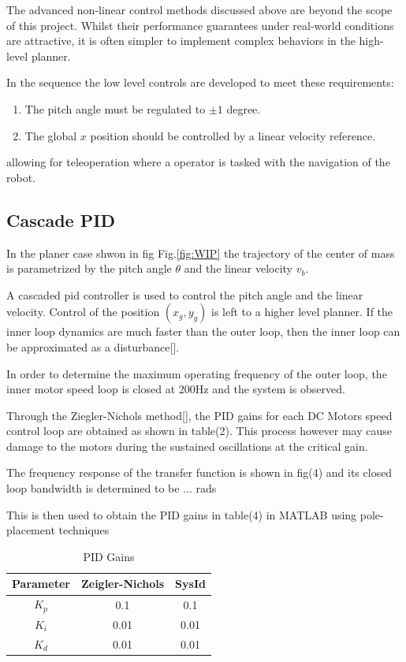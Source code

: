         The advanced non-linear control methods discussed above are beyond the scope of this project. 
        Whilst their performance guarantees under real-world conditions are attractive, it is often simpler 
        to implement complex behaviors in the high-level planner.

        In the sequence the low level controls are developed to meet these requirements:
        \begin{enumerate}
            \item The pitch angle must be regulated to $±1$ degree.
            \item The global $x$ position should be controlled by a linear velocity reference.
        \end{enumerate}
        allowing for teleoperation where a operator is tasked with the navigation of the robot. 

        \subsection{Cascade PID}
        
        In the planer case shwon in fig Fig.\ref{fig:WIP} the trajectory of the center of mass is parametrized by 
        the pitch angle $\theta$ and the linear velocity $v_b$. 
    

        A cascaded pid controller is used to control the pitch angle and the linear velocity. 
        Control of the position $(x_g,y_g)$ is left to a higher level planner.  
        If the inner loop dynamics are much faster than the outer loop, 
        then the inner loop can be approximated as a disturbance[].

        In order to determine the maximum operating frequency of the outer loop, 
        the inner motor speed loop is closed at 200Hz and the system is observed.
        
        Through the Ziegler-Nichols method[], the PID gains for each DC Motors speed control loop 
        are obtained as shown in table(2). This process however may cause damage to the motors 
        during the sustained oscillations at the critical gain. 
       
        The frequency response of the transfer function is shown in fig(4) 
        and its closed loop bandwidth is determined to be ... rads

        This is then used to obtain the PID gains in table(4) in MATLAB using pole-placement techniques
        \begin{table}[H]
            \centering
            \begin{tabular}{|c|c|c|}
                \hline
                Parameter & Zeigler-Nichols & SysId \\
                \hline 
                $K_p$ & 0.1 & 0.1 \\
                $K_i$ & 0.01 & 0.01 \\
                $K_d$ & 0.01 & 0.01 \\
                \hline
            \end{tabular}
            \caption{PID Gains}
        \end{table}

